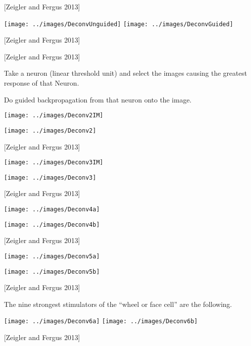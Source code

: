 {\centerline{[Zeigler and Fergus 2013]}

\centerline{\texttt{[image: ../images/DeconvUnguided]} \hfill \texttt{[image: ../images/DeconvGuided]}}

\centerline{[Zeigler and Fergus 2013]}


\centerline{[Zeigler and Fergus 2013]}

\vfill
Take a neuron (linear threshold unit) and select the images causing the greatest response of that Neuron.

\vfill
Do guided backpropagation from that neuron onto the image.


\centerline{\texttt{[image: ../images/Deconv2IM]}}

\centerline{\texttt{[image: ../images/Deconv2]}}

\centerline{[Zeigler and Fergus 2013]}


\centerline{\texttt{[image: ../images/Deconv3IM]}}

\centerline{\texttt{[image: ../images/Deconv3]}}

\centerline{[Zeigler and Fergus 2013]}


\centerline{\texttt{[image: ../images/Deconv4a]}}

\centerline{\texttt{[image: ../images/Deconv4b]}}

\centerline{[Zeigler and Fergus 2013]}



\centerline{\texttt{[image: ../images/Deconv5a]}}

\centerline{\texttt{[image: ../images/Deconv5b]}}

\centerline{[Zeigler and Fergus 2013]}


The nine strongest stimulators of the ``wheel or face cell'' are the following.

\vfill
\centerline{\texttt{[image: ../images/Deconv6a]} \hfill \texttt{[image: ../images/Deconv6b]}}

\vfill
\centerline{[Zeigler and Fergus 2013]}

}
